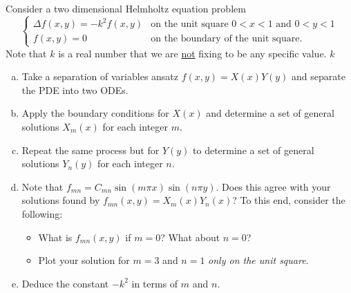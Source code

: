 \documentclass[12pt]{amsbook}
\begin{document}
\begin{problem}
Consider a two dimensional Helmholtz equation problem
\[
\begin{cases}
    \Delta f(x,y) = -k^2 f(x,y) & \textrm{on the unit square $0<x<1$ and $0<y<1$}\\
    f(x,y) = 0 & \textrm{on the boundary of the unit square}.
\end{cases}
\]
Note that $k$ is a real number that we are \underline{not} fixing to be any specific value. $k$ 
\begin{enumerate}[(a)]
\vspace*{0.25cm}
    \item Take a separation of variables ansatz $f(x,y)=X(x)Y(y)$ and separate the PDE into two ODEs.
\vspace*{0.25cm}
    \item Apply the boundary conditions for $X(x)$ and determine a set of general solutions $X_m(x)$ for each integer $m$.
\vspace*{0.25cm}
    \item Repeat the same process but for $Y(y)$ to determine a set of general solutions $Y_n(y)$ for each integer $n$.
\vspace*{0.25cm}
    \item Note that $f_{mn}=C_{mn}\sin(m\pi x)\sin(n \pi y)$. Does this agree with your solutions found by $f_{mn}(x,y)=X_m(x)Y_n(x)$? To this end, consider the following:
\vspace*{0.25cm}
\begin{itemize}
    \item What is $f_{mn}(x,y)$ if $m=0$? What about $n=0$? 
\vspace*{0.25cm}
    \item Plot your solution for $m=3$ and $n=1$ \emph{only on the unit square}.
\end{itemize}
\vspace*{0.25cm}
    \item Deduce the constant $-k^2$ in terms of $m$ and $n$. 
\end{enumerate}
\end{problem}
\end{document}
